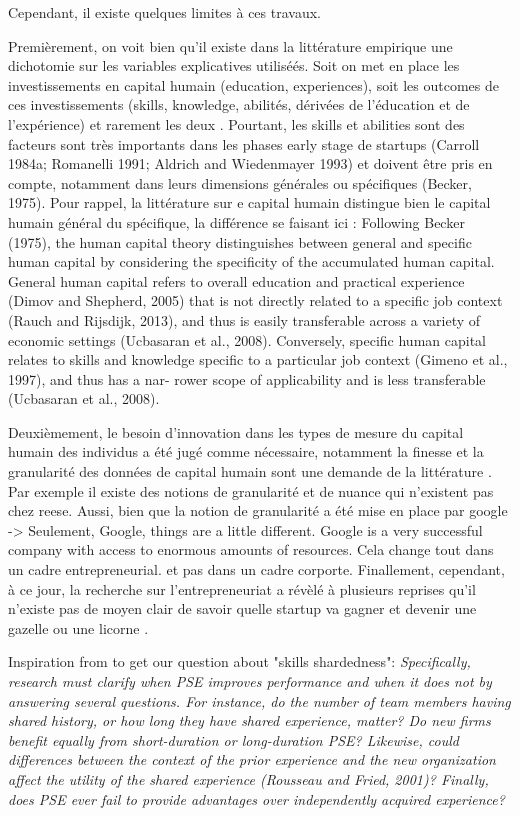 \documentclass[12pt]{article}
\begin{document}
Cependant, il existe quelques limites à ces travaux.

Premièrement, on voit bien qu'il existe dans la littérature empirique une dichotomie sur les variables explicatives utiliséés. Soit on met en place les investissements en capital humain (education, experiences), soit les outcomes de ces investissements (skills, knowledge, abilités, dérivées de l'éducation et de l'expérience) et rarement les deux \citet{becker1964human, unger2011human, marvel2016human, reese2020should}. Pourtant, les skills et abilities sont des facteurs sont très importants dans les phases early stage de startups (Carroll 1984a; Romanelli 1991; Aldrich and Wiedenmayer 1993) et doivent être pris en compte, notamment dans leurs dimensions générales ou spécifiques (Becker, 1975). Pour rappel, la littérature sur e capital humain distingue bien le capital humain général du spécifique, la différence se faisant ici :
Following Becker (1975), the human capital theory distinguishes between general and specific human capital by considering the specificity of the accumulated human capital. General human capital refers to overall education and practical experience (Dimov and Shepherd, 2005) that is not directly related to a specific job context (Rauch and Rijsdijk, 2013), and thus is easily transferable across a variety of economic settings (Ucbasaran et al., 2008). Conversely, specific human capital relates to skills and knowledge specific to a particular job context (Gimeno et al., 1997), and thus has a nar- rower scope of applicability and is less transferable (Ucbasaran et al., 2008).

Deuxièmement, le besoin d'innovation dans les types de mesure du capital humain des individus a été jugé comme nécessaire, notamment la finesse et la granularité des données de capital humain sont une demande de la littérature \citep{marvel2016human}. Par exemple il existe des notions de granularité et de nuance qui n'existent pas chez reese. Aussi, bien que la notion de granularité a été mise en place par google -> Seulement, Google, things are a little different. Google is a very successful company with access to enormous amounts of resources. Cela change tout dans un cadre entrepreneurial. et pas dans un cadre corporte. Finallement, cependant, à ce jour, la recherche sur l'entrepreneuriat a révèlé à plusieurs reprises qu'il n'existe pas de moyen clair de savoir quelle startup va gagner et devenir une gazelle ou une licorne \citep{aldrich2018unicorns}.

Inspiration from \citep{zheng2016shared} to get our question about "skills shardedness": \textit{Specifically, research must clarify when PSE improves performance and when it does not by answering several questions. For instance, do the number of team members having shared history, or how long they have shared experience, matter? Do new firms benefit equally from short-duration or long-duration PSE? Likewise, could differences between the context of the prior experience and the new organization affect the utility of the shared experience (Rousseau and Fried, 2001)? Finally, does PSE ever fail to provide advantages over independently acquired experience?}
\end{document}
